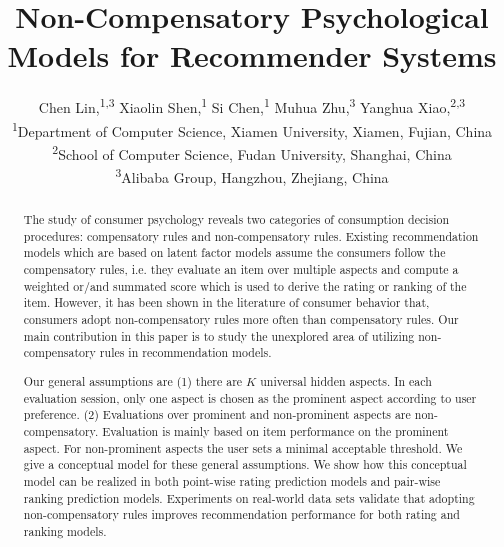 \documentclass[letterpaper]{article} %
\begin{document}
\title{Non-Compensatory Psychological Models for Recommender Systems}
\author{Chen Lin,\textsuperscript{\rm 1,\rm 3} Xiaolin Shen,\textsuperscript{\rm 1} Si Chen,\textsuperscript{\rm 1} Muhua Zhu,\textsuperscript{\rm 3} Yanghua Xiao,\textsuperscript{\rm 2,3}\\
\textsuperscript{\rm 1}Department of Computer Science, Xiamen University, Xiamen, Fujian, China\\
\textsuperscript{\rm 2}School of Computer Science, Fudan University, Shanghai, China \\
\textsuperscript{\rm 3}Alibaba Group, Hangzhou, Zhejiang, China\\}
\setlength\titlebox{2.5in}

\maketitle
\begin{abstract}
The study of consumer psychology reveals two categories of consumption decision procedures: compensatory rules and non-compensatory rules. Existing recommendation models which are based on latent factor models assume the consumers follow the compensatory rules, i.e. they evaluate an item over multiple aspects and compute a weighted or/and summated score which is used to derive the rating or ranking of the item. However, it has been shown in the literature of consumer behavior that, consumers adopt non-compensatory rules more often than compensatory rules. Our main contribution in this paper is to study the unexplored area of utilizing non-compensatory rules in recommendation models. 

Our general assumptions are (1) there are $K$ universal hidden aspects. In each evaluation session, only one aspect is chosen as the prominent aspect according to user preference. (2) Evaluations over prominent and non-prominent aspects are non-compensatory. Evaluation is mainly based on item performance on the prominent aspect. For non-prominent aspects the user sets a minimal acceptable threshold. We give a conceptual model for these general assumptions. We show how this conceptual model can be realized in both point-wise rating prediction models and pair-wise ranking prediction models. Experiments on real-world data sets validate that adopting non-compensatory rules improves recommendation performance for both rating and ranking models.
\end{abstract}
\end{document}
